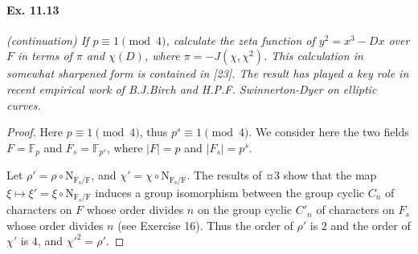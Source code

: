 \documentclass[11pt,a4paper]{article}
\newcommand{\F}{\mathbb{F}}
\begin{document}
\paragraph{Ex. 11.13}{\it (continuation) If $p\equiv 1 \pmod 4$, calculate the zeta function of $y^2 = x^3 - Dx$ over $F$ in terms of $\pi$ and $\chi(D)$, where $\pi = -J(\chi,\chi^2)$. This calculation in somewhat sharpened form is contained in [23]. The result has played a key role in recent empirical work of B.J.Birch and H.P.F. Swinnerton-Dyer on elliptic curves.
}

\begin{proof}
Here $p\equiv1 \pmod 4$, thus $p^s \equiv 1 \pmod 4$. We consider here the two fields $F = \F_p$ and $F_s = \F_{p^s}$, where $|F| = p$ and $|F_s| = p^s$.

Let $\rho' = \rho \circ \mathrm{N_{F_s/F}}$, and $\chi' = \chi \circ  \mathrm{N_{F_s/F}}$. The results of ¤3 show that the map $\xi \mapsto \xi' = \xi \circ\mathrm{N_{F_s/F}}$ induces a group isomorphism between the group cyclic $C_n$ of characters on $F$ whose order divides $n$ on the group cyclic $C'_n$ of characters  on $F_s$ whose order divides $n$ (see Exercise 16). Thus the order of $\rho'$ is $2$ and the order of $\chi'$ is $4$, and $\chi'^2 = \rho'$.


\end{proof}
\end{document}
